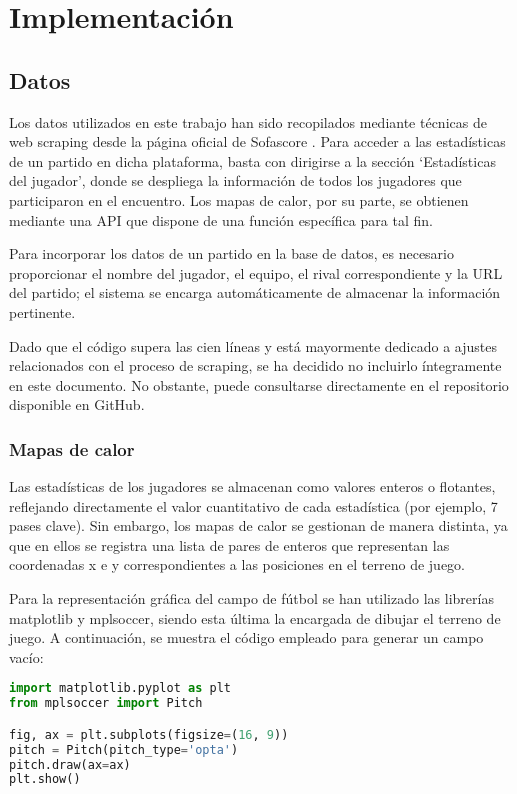 \chapter{Implementación}

\section{Datos}
Los datos utilizados en este trabajo han sido recopilados mediante técnicas de web scraping desde la página oficial de Sofascore \cite{Sofascore}. Para acceder a las estadísticas de un partido en dicha plataforma, basta con dirigirse a la sección ‘Estadísticas del jugador’, donde se despliega la información de todos los jugadores que participaron en el encuentro. Los mapas de calor, por su parte, se obtienen mediante una API que dispone de una función específica para tal fin.

Para incorporar los datos de un partido en la base de datos, es necesario proporcionar el nombre del jugador, el equipo, el rival correspondiente y la URL del partido; el sistema se encarga automáticamente de almacenar la información pertinente.

Dado que el código supera las cien líneas y está mayormente dedicado a ajustes relacionados con el proceso de scraping, se ha decidido no incluirlo íntegramente en este documento. No obstante, puede consultarse directamente en el repositorio disponible en GitHub.

\subsection{Mapas de calor}
Las estadísticas de los jugadores se almacenan como valores enteros o flotantes, reflejando directamente el valor cuantitativo de cada estadística (por ejemplo, 7 pases clave). Sin embargo, los mapas de calor se gestionan de manera distinta, ya que en ellos se registra una lista de pares de enteros que representan las coordenadas x e y correspondientes a las posiciones en el terreno de juego.

Para la representación gráfica del campo de fútbol se han utilizado las librerías matplotlib y mplsoccer, siendo esta última la encargada de dibujar el terreno de juego. A continuación, se muestra el código empleado para generar un campo vacío:


\begin{lstlisting}[language=Python, caption={Representación campo vacío}, label={lst:codigo-python}]
import matplotlib.pyplot as plt
from mplsoccer import Pitch

fig, ax = plt.subplots(figsize=(16, 9))
pitch = Pitch(pitch_type='opta')
pitch.draw(ax=ax)
plt.show()
\end{lstlisting}

